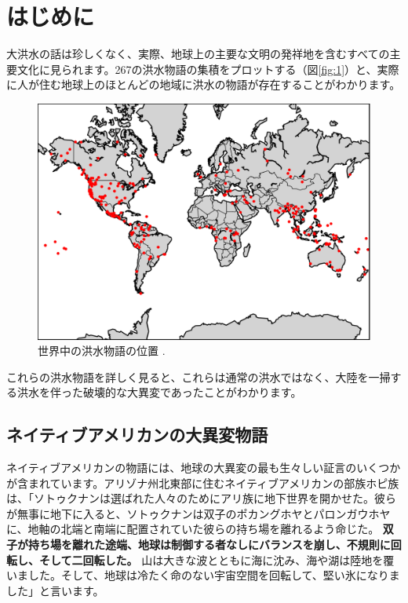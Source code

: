 \documentclass[10pt,twocolumn,letterpaper]{article}
\begin{document}
\section{はじめに}

大洪水の話は珍しくなく、実際、地球上の主要な文明の発祥地を含むすべての主要文化に見られます。267の洪水物語の集積をプロットする（図\ref{fig:1}）と、実際に人が住む地球上のほとんどの地域に洪水の物語が存在することがわかります。

\begin{figure}[h]
\begin{center}
   \includegraphics[width=1\linewidth]{b.png}
\end{center}
   \caption{世界中の洪水物語の位置 \cite{3}.}
\label{fig:1}
\label{fig:onecol}
\end{figure}

これらの洪水物語を詳しく見ると、これらは通常の洪水ではなく、大陸を一掃する洪水を伴った破壊的な大異変であったことがわかります。

\subsection{ネイティブアメリカンの大異変物語}

ネイティブアメリカンの物語には、地球の大異変の最も生々しい証言のいくつかが含まれています。アリゾナ州北東部に住むネイティブアメリカンの部族ホピ族は、「ソトゥクナンは選ばれた人々のためにアリ族に地下世界を開かせた。彼らが無事に地下に入ると、ソトゥクナンは双子のポカングホヤとパロンガウホヤに、地軸の北端と南端に配置されていた彼らの持ち場を離れるよう命じた。 \textbf{双子が持ち場を離れた途端、地球は制御する者なしにバランスを崩し、不規則に回転し、そして二回転した。} 山は大きな波とともに海に沈み、海や湖は陸地を覆いました。そして、地球は冷たく命のない宇宙空間を回転して、堅い氷になりました」と言います\cite{4}。
\end{document}
